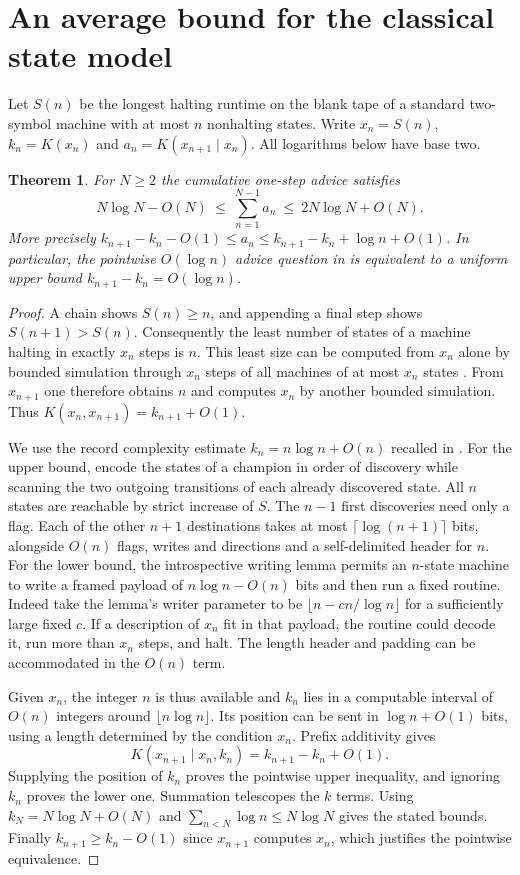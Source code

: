 \documentclass[11pt]{article}
\newtheorem{theorem}{Theorem}
\begin{document}
\section*{An average bound for the classical state model}
Let $S(n)$ be the longest halting runtime on the blank tape of a standard two-symbol machine with at most $n$ nonhalting states. Write $x_n=S(n)$, $k_n=K(x_n)$ and $a_n=K(x_{n+1}\mid x_n)$. All logarithms below have base two.

\begin{theorem}\label{classic}
For $N\ge2$ the cumulative one-step advice satisfies
\[
 N\log N-O(N)\ \le\ \sum_{n=1}^{N-1} a_n
       \ \le\ 2N\log N+O(N).
\]
More precisely $k_{n+1}-k_n-O(1)\le a_n\le k_{n+1}-k_n+\log n+O(1)$. In particular, the pointwise $O(\log n)$ advice question in \cite[Section 5.5]{aaronson} is equivalent to a uniform upper bound $k_{n+1}-k_n=O(\log n)$.
\end{theorem}
\begin{proof}
A chain shows $S(n)\ge n$, and appending a final step shows $S(n+1)>S(n)$. Consequently the least number of states of a machine halting in exactly $x_n$ steps is $n$. This least size can be computed from $x_n$ alone by bounded simulation through $x_n$ steps of all machines of at most $x_n$ states \cite{brumleve}. From $x_{n+1}$ one therefore obtains $n$ and computes $x_n$ by another bounded simulation. Thus $K(x_n,x_{n+1})=k_{n+1}+O(1)$.

We use the record complexity estimate $k_n=n\log n+O(n)$ recalled in \cite[Section 5.5]{aaronson}. For the upper bound, encode the states of a champion in order of discovery while scanning the two outgoing transitions of each already discovered state. All $n$ states are reachable by strict increase of $S$. The $n-1$ first discoveries need only a flag. Each of the other $n+1$ destinations takes at most $\lceil\log(n+1)\rceil$ bits, alongside $O(n)$ flags, writes and directions and a self-delimited header for $n$. For the lower bound, the introspective writing lemma \cite[Lemma 17]{aaronson} permits an $n$-state machine to write a framed payload of $n\log n-O(n)$ bits and then run a fixed routine. Indeed take the lemma's writer parameter to be $\lfloor n-c n/\log n\rfloor$ for a sufficiently large fixed $c$. If a description of $x_n$ fit in that payload, the routine could decode it, run more than $x_n$ steps, and halt. The length header and padding can be accommodated in the $O(n)$ term.

Given $x_n$, the integer $n$ is thus available and $k_n$ lies in a computable interval of $O(n)$ integers around $\lfloor n\log n\rfloor$. Its position can be sent in $\log n+O(1)$ bits, using a length determined by the condition $x_n$. Prefix additivity gives
\[
 K(x_{n+1}\mid x_n,k_n)=k_{n+1}-k_n+O(1).
\]
Supplying the position of $k_n$ proves the pointwise upper inequality, and ignoring $k_n$ proves the lower one. Summation telescopes the $k$ terms. Using $k_N=N\log N+O(N)$ and $\sum_{n<N}\log n\le N\log N$ gives the stated bounds. Finally $k_{n+1}\ge k_n-O(1)$ since $x_{n+1}$ computes $x_n$, which justifies the pointwise equivalence.
\end{proof}
\end{document}

